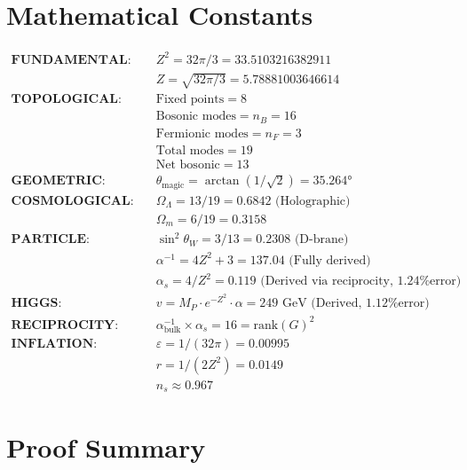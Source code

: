 \documentclass[12pt,a4paper]{article}
\newcommand{\OmegaL}{\Omega_\Lambda}
\newcommand{\OmegaM}{\Omega_m}
\newcommand{\sinW}{\sin^2\theta_W}
\newcommand{\nB}{n_B}
\newcommand{\nF}{n_F}
\newcommand{\Zsq}{Z^2}
\begin{document}
\appendix

\section{Mathematical Constants}

\begin{align}
\textbf{FUNDAMENTAL:} \quad & \Zsq = 32\pi/3 = 33.5103216382911 \\
& Z = \sqrt{32\pi/3} = 5.78881003646614 \\[1em]
\textbf{TOPOLOGICAL:} \quad & \text{Fixed points} = 8 \\
& \text{Bosonic modes} = \nB = 16 \\
& \text{Fermionic modes} = \nF = 3 \\
& \text{Total modes} = 19 \\
& \text{Net bosonic} = 13 \\[1em]
\textbf{GEOMETRIC:} \quad & \theta_{\text{magic}} = \arctan(1/\sqrt{2}) = 35.264° \\[1em]
\textbf{COSMOLOGICAL:} \quad & \OmegaL = 13/19 = 0.6842 \text{ (Holographic)} \\
& \OmegaM = 6/19 = 0.3158 \\[1em]
\textbf{PARTICLE:} \quad & \sinW = 3/13 = 0.2308 \text{ (D-brane)} \\
& \alpha^{-1} = 4\Zsq + 3 = 137.04 \text{ (Fully derived)} \\
& \alpha_s = 4/\Zsq = 0.119 \text{ (Derived via reciprocity, 1.24\% error)} \\[1em]
\textbf{HIGGS:} \quad & v = M_P \cdot e^{-\Zsq} \cdot \alpha = 249 \text{ GeV (Derived, 1.12\% error)} \\[1em]
\textbf{RECIPROCITY:} \quad & \alpha^{-1}_{\text{bulk}} \times \alpha_s = 16 = \text{rank}(G)^2 \\[1em]
\textbf{INFLATION:} \quad & \varepsilon = 1/(32\pi) = 0.00995 \\
& r = 1/(2\Zsq) = 0.0149 \\
& n_s \approx 0.967
\end{align}

\section{Proof Summary}
\end{document}
